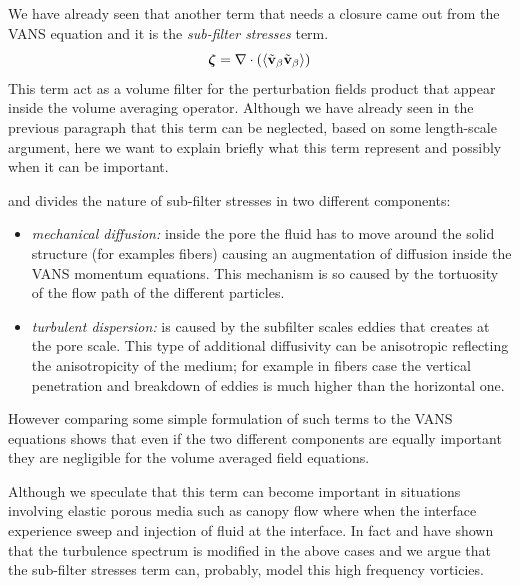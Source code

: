 We have already seen that another term that needs a closure came out from the VANS equation and it is the \textit{sub-filter stresses} term.
$$\boldsymbol{\zeta} = \nabla \cdot \left({\left< \tilde{\textbf{v}}_{\beta} \tilde{\textbf{v}}_{\beta} \right>}\right)$$
This term act as a volume filter for the perturbation fields product that appear inside the volume averaging operator.
Although we have already seen in the previous paragraph that this term can be neglected, based on some length-scale argument, here we want to explain briefly what this term represent and possibly when it can be important.

\citet{breugem2006influence} and \citet{nepf1999drag} divides the nature of sub-filter stresses in two different components:
\begin{itemize}
	\item \textit{mechanical diffusion:} inside the pore the fluid has to move around the solid structure (for examples fibers) causing an augmentation of diffusion inside the VANS momentum equations. This mechanism is so caused by the tortuosity of the flow path of the different particles.
	\item \textit{turbulent dispersion:} is caused by the subfilter scales eddies that creates at the pore scale. This type of additional diffusivity can be anisotropic reflecting the anisotropicity of the medium; for example in fibers case the vertical penetration and breakdown of eddies is much higher than the horizontal one.
\end{itemize}

However comparing some simple formulation of such terms to the VANS equations shows that even if the two different components are equally important they are negligible for the volume averaged field equations.

%

Although we speculate that this term can become important in situations involving elastic porous media such as canopy flow where when the interface experience sweep and injection of fluid at the interface.
In fact \citet{finnigan2000turbulence} and \citet{de2008effects} have shown that the turbulence spectrum is modified in the above cases and we argue that the sub-filter stresses term can, probably, model this high frequency vorticies.

